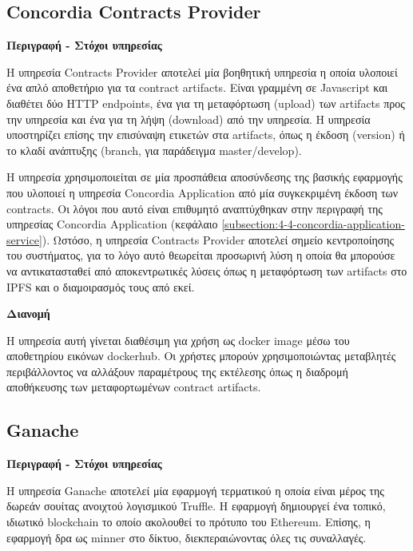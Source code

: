 \subsection{Concordia Contracts Provider} \label{subsection:4-4-concordia-contracts-provider-service}

\vspace{0.5cm}
\textbf{Περιγραφή - Στόχοι υπηρεσίας}

Η υπηρεσία Contracts Provider αποτελεί μία βοηθητική υπηρεσία η οποία υλοποιεί ένα απλό αποθετήριο για τα contract artifacts. Είναι γραμμένη σε Javascript και διαθέτει δύο HTTP \textenglish{endpoints}, ένα για τη μεταφόρτωση (upload) των artifacts προς την υπηρεσία και ένα για τη λήψη (download) από την υπηρεσία. Η υπηρεσία υποστηρίζει επίσης την επισύναψη ετικετών στα artifacts, όπως η έκδοση (version) ή το κλαδί ανάπτυξης (branch, για παράδειγμα \textenglish{master/develop}).

Η υπηρεσία χρησιμοποιείται σε μία προσπάθεια αποσύνδεσης της βασικής εφαρμογής που υλοποιεί η υπηρεσία Concordia Application από μία συγκεκριμένη έκδοση των contracts. Οι λόγοι που αυτό είναι επιθυμητό αναπτύχθηκαν στην περιγραφή της υπηρεσίας Concordia \textenglish{Application} (κεφάλαιο \ref{subsection:4-4-concordia-application-service}). Ωστόσο, η υπηρεσία Contracts Provider αποτελεί σημείο κεντροποίησης του συστήματος, για το λόγο αυτό θεωρείται προσωρινή λύση η οποία θα μπορούσε να αντικατασταθεί από αποκεντρωτικές λύσεις όπως η μεταφόρτωση των artifacts στο IPFS και ο διαμοιρασμός τους από εκεί.

\vspace{0.5cm}
\textbf{Διανομή}

Η υπηρεσία αυτή γίνεται διαθέσιμη για χρήση ως docker image μέσω του αποθετηρίου εικόνων dockerhub. Οι χρήστες μπορούν χρησιμοποιώντας μεταβλητές περιβάλλοντος να αλλάξουν παραμέτρους της εκτέλεσης όπως η διαδρομή αποθήκευσης των μεταφορτωμένων contract artifacts.

\subsection{Ganache} \label{subsection:4-4-ganache-service}

\vspace{0.5cm}
\textbf{Περιγραφή - Στόχοι υπηρεσίας}

Η υπηρεσία Ganache αποτελεί μία εφαρμογή τερματικού η οποία είναι μέρος της δωρεάν σουίτας ανοιχτού λογισμικού Truffle. Η εφαρμογή δημιουργεί ένα τοπικό, ιδιωτικό blockchain το οποίο ακολουθεί το πρότυπο του Ethereum. Επίσης, η εφαρμογή δρα ως minner στο δίκτυο, διεκπεραιώνοντας όλες τις συναλλαγές.

